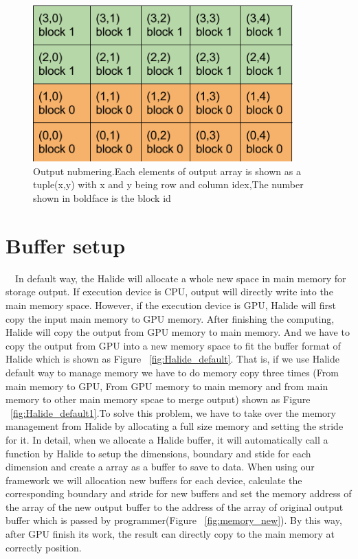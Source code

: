 \begin{figure}[!hbtp]
\centering
\includegraphics[width=10cm]{img/show_blocks.png}
\caption{Output nubmering.Each elements of output array is shown as a tuple(x,y) with x and y being row and column idex,The number shown in boldface is the block id}
\label{fig:my_label}
\end{figure}

\section{Buffer setup}
\quad \ \ In default way, the Halide will allocate a whole new space in main memory for storage output. If execution device is CPU, output will directly write into the main memory space. However, if the execution device is GPU, Halide will first copy the input main memory to GPU memory. After finishing the computing, Halide will copy the output from GPU memory to main memory. And we have to copy the output from GPU into a new memory space to fit the buffer format of Halide which is shown as Figure ~\ref{fig:Halide_default}. That is, if we use Halide default way to manage memory we have to do memory copy three times (From main memory to GPU, From GPU memory to main memory and from main memory to other main memory spcae to merge output) shown as Figure ~\ref{fig:Halide_default1}.To solve this problem, we have to take over the memory management from Halide by allocating a full size memory and setting the stride for it. In detail, when we  allocate a Halide buffer, it will automatically call a function by Halide to setup the dimensions, boundary and stide for each dimension and create a array as a buffer to save to data. When using our framework we will allocation new buffers for each device, calculate the corresponding boundary and stride for new buffers and set the memory address of the array of the new output buffer to the address of the array of original output buffer which is passed by programmer(Figure ~\ref{fig:memory_new}). By this way, after GPU finish its work, the result can directly copy to the main memory at correctly position.




